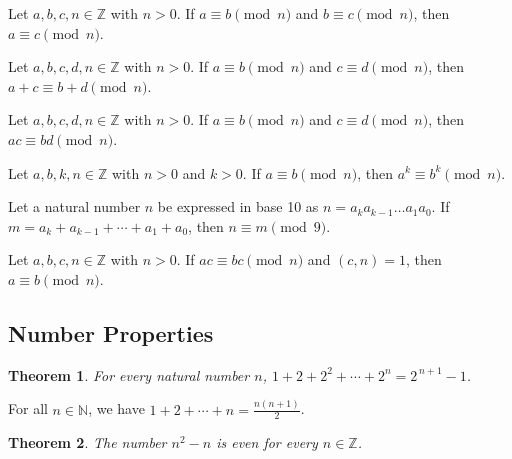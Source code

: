 \documentclass{article}
\newtheorem*{theorem*}{Theorem}
\theoremstyle{definition}
\newenvironment{manualtheorem}[1]{%
  \renewcommand{\thetheorem}{#1}%
  \theorem%
}{%
  \endtheorem%
}
\begin{document}
\begin{manualtheorem}{1.11}
	Let $a, b, c, n \in \mathbb{Z}$ with $n > 0$. If $a \equiv b \pmod{n}$ and $b \equiv c \pmod{n}$, then $a \equiv c \pmod{n}$.
\end{manualtheorem}

\begin{manualtheorem}{1.12}
	Let $a, b, c, d, n \in \mathbb{Z}$ with $n > 0$. If $a \equiv b \pmod{n}$ and $c \equiv d \pmod{n}$, then $a + c \equiv b + d \pmod{n}$.
\end{manualtheorem}

\begin{manualtheorem}{1.14}
	Let $a, b, c, d, n \in \mathbb{Z}$ with $n > 0$. If $a \equiv b \pmod{n}$ and $c \equiv d \pmod{n}$, then $ac \equiv bd \pmod{n}$.
\end{manualtheorem}

\begin{manualtheorem}{1.18}
	Let $a, b, k, n \in \mathbb{Z}$ with $n > 0$ and $k > 0$. If $a \equiv b \pmod{n}$, then $a^k \equiv b^k \pmod{n}$.
\end{manualtheorem}

\begin{manualtheorem}{1.21}
	Let a natural number $n$ be expressed in base 10 as $n = a_ka_{k-1}\ldots a_1a_0$. If $m = a_k + a_{k-1} + \cdots + a_1 + a_0$, then $n \equiv m \pmod{9}$.
\end{manualtheorem}

\begin{manualtheorem}{1.45}
	Let $a, b, c, n \in \mathbb{Z}$ with $n>0$. If $ac \equiv bc \pmod{n}$ and $(c,n)=1$, then $a \equiv b \pmod{n}$.
\end{manualtheorem}


\subsection{Number Properties}
\begin{theorem*}
	For every natural number $n$, $1 + 2 + 2^{2} + \cdots + 2^{n} = 2^{\,n+1}-1$.
\end{theorem*}

\begin{manualtheorem}{A.1}
	For all $n \in \mathbb{N}$, we have $1 + 2 + \cdots + n = \frac{n(n+1)}{2}$.
\end{manualtheorem}

\begin{theorem*}
	The number $n^2 - n$ is even for every $n \in \mathbb{Z}$.
\end{theorem*}
\end{document}
